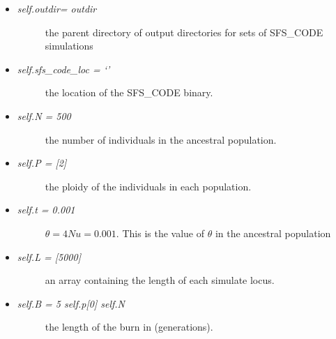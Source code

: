 \documentclass[letterpaper,10pt,english]{sphinxmanual}
\begin{document}
\begin{fulllineitems}
\begin{itemize}
\begin{itemize}
\item {} \begin{description}
\item[{\emph{self.outdir= outdir}   }] \leavevmode
the parent directory of output directories for sets of SFS\_CODE 
simulations

\end{description}

\item {} \begin{description}
\item[{\emph{self.sfs\_code\_loc = `'}   }] \leavevmode
the location of the SFS\_CODE binary.

\end{description}

\item {} \begin{description}
\item[{\emph{self.N = 500}  }] \leavevmode
the number of individuals in the ancestral population.

\end{description}

\item {} \begin{description}
\item[{\emph{self.P = {[}2{]}}  }] \leavevmode
the ploidy of the individuals in each population.

\end{description}

\item {} \begin{description}
\item[{\emph{self.t = 0.001}}] \leavevmode
\(\theta = 4Nu = 0.001\).  This is the value of 
\(\theta\) in the ancestral population

\end{description}

\item {} \begin{description}
\item[{\emph{self.L = {[}5000{]}} }] \leavevmode
an array containing the length of each simulate locus.

\end{description}

\item {} \begin{description}
\item[{\emph{self.B = 5 self.p{[}0{]} self.N} }] \leavevmode
the length of the burn in (generations).


\end{description}
\end{itemize}
\end{itemize}
\end{fulllineitems}
\end{document}
